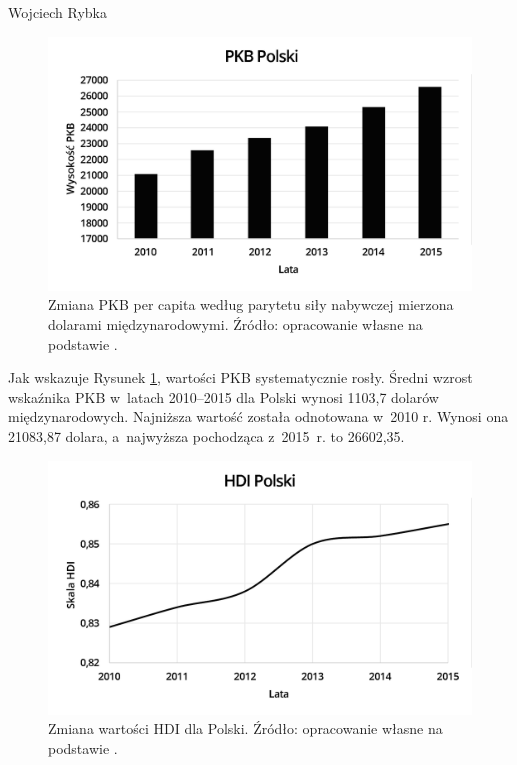 \begin{artplenv}{Wojciech Rybka}
\begin{figure}[h]
	\centering
	\includegraphics[width=1\textwidth]{ART_Rybka/pkb_polski.png} 
	\caption{Zmiana PKB per capita według parytetu siły nabywczej mierzona dolarami międzynarodowymi.
		Źródło: opracowanie własne na podstawie
		\parencite{international_monetary_fund_world_2019a}.
	}
	\label{fig1:ryb}
\end{figure}


%
%
%

Jak wskazuje Rysunek \ref{fig1:ryb}, wartości PKB systematycznie rosły. Średni wzrost wskaźnika PKB w~latach 2010–2015 dla Polski
wynosi 1103,7 dolarów międzynarodowych. Najniższa wartość została odnotowana w~2010 r. Wynosi ona 21083,87 dolara,
a~najwyższa pochodząca z~2015~r. to 26602,35. 

\begin{figure}[H]
	\centering
	\includegraphics[width=1\textwidth]{ART_Rybka/hdi_polski.png} 
	\caption{Zmiana wartości HDI dla Polski.
		Źródło: opracowanie własne na podstawie
		\parencite{united_nations_development_programme_human_2019}.
	}
	\label{fig2:ryb}
\end{figure}



\end{artplenv}
